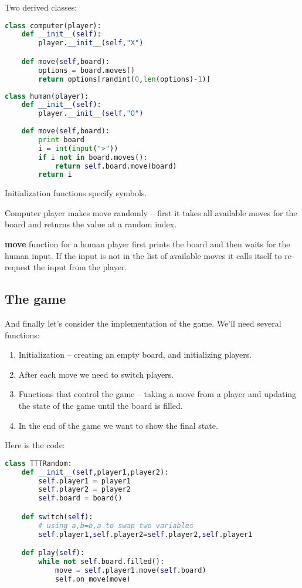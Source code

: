 Two derived classes:

\begin{lstlisting}[language=Python,style=codelst2,caption={Tic-Tac-Toe: player-computer}]
class computer(player):
    def __init__(self):
        player.__init__(self,"X")

    def move(self,board):
        options = board.moves()
        return options[randint(0,len(options)-1)]
\end{lstlisting}

\begin{lstlisting}[language=Python,style=codelst2,caption={Tic-Tac-Toe: player accepting moves from a human}]
class human(player):
    def __init__(self):
        player.__init__(self,"O")
    
    def move(self,board):
        print board
        i = int(input(">"))
        if i not in board.moves(): 
            return self.board.move(board)
        return i
\end{lstlisting}

Initialization functions specify symbols.

Computer player makes move randomly -- first it takes all
available moves for the board and returns the value at a random index.

\textbf{move} function for a human player first prints the board and then
waits for the human input. If the input is not in the list of available
moves it calls itself to re-request the input from the player.

\subsection{The game}

And finally let's consider the implementation of the game.
We'll need several functions:
\begin{enumerate}
\item Initialization -- creating an empty board, and initializing players.
\item After each move we need to switch players.
\item Functions that control the game -- taking a move from a player
and updating the state of the game until the board is filled.
\item In the end of the game we want to show the final state.
\end{enumerate}

Here is the code:

\begin{lstlisting}[language=Python,style=codelst2,caption={Tic-Tac-Toe: the game}]
class TTTRandom:
    def __init__(self,player1,player2):
        self.player1 = player1
        self.player2 = player2
        self.board = board()

    def switch(self):
        # using a,b=b,a to swap two variables
        self.player1,self.player2=self.player2,self.player1

    def play(self):
        while not self.board.filled():
            move = self.player1.move(self.board)
            self.on_move(move)
\end{lstlisting}

